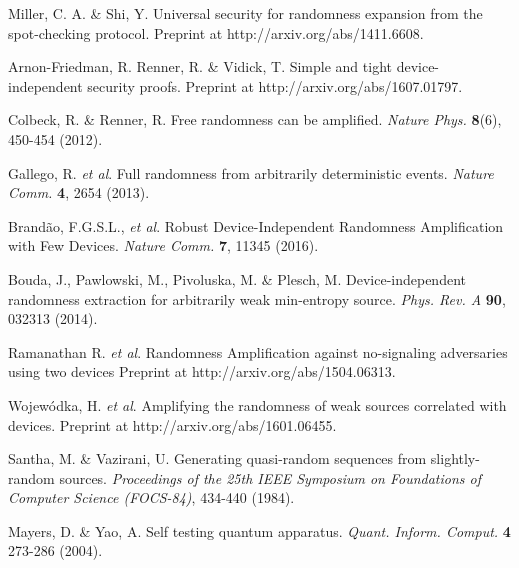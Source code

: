 \documentclass[11pt,a4paper]{article}
\begin{document}
{\begin{thebibliography}{99}
Miller, C. A. \& Shi, Y. Universal security for randomness expansion from the spot-checking protocol. Preprint at http://arxiv.org/abs/1411.6608.

 Arnon-Friedman, R. Renner, R. \& Vidick, T. Simple and tight device-independent security proofs. Preprint at http://arxiv.org/abs/1607.01797.


Colbeck, R. \& Renner, R. Free randomness can be amplified. \textit{Nature Phys.} \textbf{8}(6), 450-454 (2012).

Gallego, R. {\em et al}.
Full randomness from arbitrarily deterministic events.
\textit{Nature Comm.} \textbf{4}, 2654 (2013).

Brand\~ao, F.G.S.L., {\em et al}.
Robust Device-Independent Randomness Amplification with Few Devices. \textit{Nature Comm.} {\bf 7}, 11345 (2016).

Bouda, J., Pawlowski, M., Pivoluska, M. \& Plesch, M. Device-independent randomness extraction for arbitrarily weak min-entropy source. \textit{Phys. Rev. A} \textbf{90}, 032313 (2014).

Ramanathan R. {\em et al}.
Randomness Amplification against no-signaling adversaries using two devices Preprint at http://arxiv.org/abs/1504.06313.

Wojew\'odka, H. {\em et al}.
Amplifying the randomness of weak sources correlated with devices. Preprint at http://arxiv.org/abs/1601.06455.

Santha, M. \& Vazirani, U. Generating quasi-random
sequences from slightly-random sources.
\textit{Proceedings of
the 25th IEEE Symposium on Foundations of Computer
Science (FOCS-84)}, 434-440 (1984).

Mayers, D. \& Yao, A. Self testing quantum apparatus. \textit{Quant.
Inform. Comput.} {\bf 4} 273-286 (2004).


\end{thebibliography}}
\end{document}
